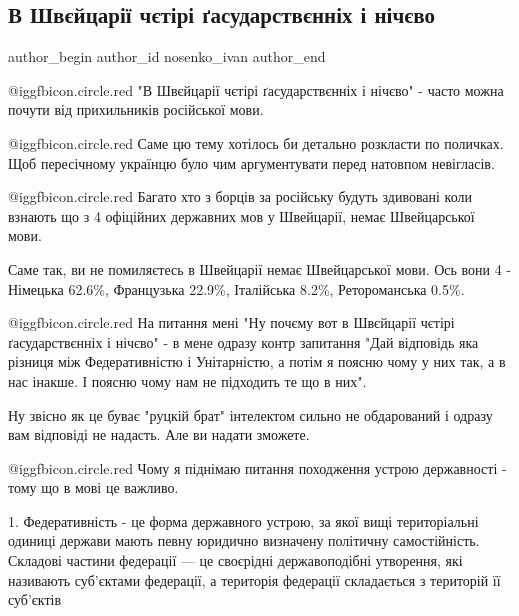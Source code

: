  
 
 
 
 
 
\subsection{В Швєйцарії чєтірі ґасударствєнніх і нічєво}
\label{sec:30_09_2021.fb.nosenko_ivan.1.mova_shvejcaria}
 
\ifcmt
 author_begin
   author_id nosenko_ivan
 author_end
\fi

@igg{fbicon.circle.red}  "В Швєйцарії чєтірі ґасударствєнніх і нічєво" - часто
можна почути від прихильників російської мови.

@igg{fbicon.circle.red}  Саме цю тему хотілось би детально розкласти по
поличках. Щоб пересічному українцю було чим аргументувати перед натовпом
невігласів.

@igg{fbicon.circle.red}  Багато хто з борців за російську будуть здивовані
коли взнають що з 4 офіційних державних мов у Швейцарії, немає Швейцарської
мови. 

Саме так, ви не помиляєтесь в Швейцарії немає Швейцарської мови. Ось вони 4 -
Німецька 62.6\%, Французька 22.9\%, Італійська 8.2\%, Ретороманська 0.5\%.

 @igg{fbicon.circle.red}  На питання мені "Ну почєму вот в Швєйцарії чєтірі ґасударствєнніх і нічєво"
- в мене одразу контр запитання "Дай відповідь яка різниця між Федеративністю і
Унітарністю, а потім я поясню чому у них так, а в нас інакше. І поясню чому нам
не підходить те що в них".

Ну звісно як це буває "руцкій брат" інтелектом сильно не обдарований і одразу
вам відповіді не надасть. Але ви надати зможете.

 @igg{fbicon.circle.red}  Чому я піднімаю питання походження устрою державності - тому що в мові це
важливо.

1. Федеративність - це форма державного устрою, за якої вищі територіальні
одиниці держави мають певну юридично визначену політичну самостійність.
Складові частини федерації — це своєрідні державоподібні утворення, які
називають суб'єктами федерації, а територія федерації складається з територій
її суб'єктів

